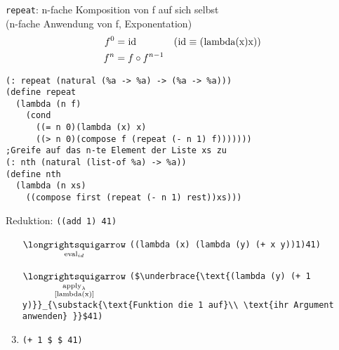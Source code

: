 \lstinline|repeat|: n-fache Komposition von f auf sich selbst\\
(n-fache Anwendung von f, Exponentation)\\
\begin{align*}
f^0 &= \text{\lstinline|id|} &(\text{\lstinline|id|} \equiv \text{\lstinline|(lambda(x)x)|)}\\
f^n &= f \circ f^{n-1}& 
\end{align*}
\begin{lstlisting}
(: repeat (natural (%a -> %a) -> (%a -> %a)))
(define repeat
  (lambda (n f)
    (cond
      ((= n 0)(lambda (x) x)
      ((> n 0)(compose f (repeat (- n 1) f)))))))
;Greife auf das n-te Element der Liste xs zu
(: nth (natural (list-of %a) -> %a))
(define nth
  (lambda (n xs)
    ((compose first (repeat (- n 1) rest))xs)))
\end{lstlisting}


Reduktion:
\lstinline|((add 1) 41)|
\begin{enumerate}
\item[$\underset{\t{eval}_{id}}{\text{\eval}}$] \lstinline|((lambda (x) (lambda (y) (+ x y))1)41)|
\item[$\underset{\substack{\t{apply}_{\lambda}\\ [ \text{lambda(x)} ]}}{\text{\eval}}$] \lstinline[mathescape]|($\underbrace{\text{(lambda (y) (+ 1 y)}}_{\substack{\text{Funktion die 1 auf}\\ \text{ihr Argument anwenden} }}$41)|
\item[$\underset{\substack{\t{apply}_{\lambda}\\ [ \text{lambda(y)} ]}}{\text{\eval}}$] \lstinline[mathescape]|(+ 1 $ $ 41)|
\end{enumerate}
